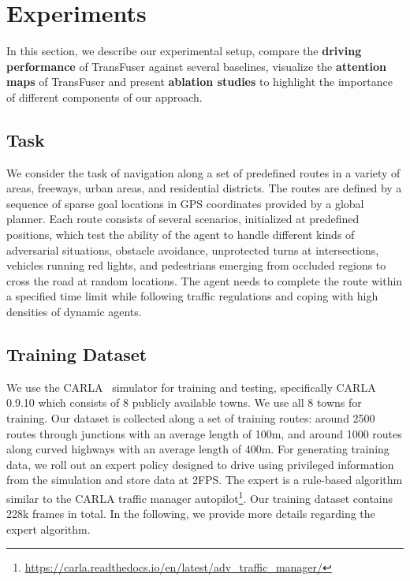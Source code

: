 \section{Experiments}
\label{sec:results}

In this section, we describe our experimental setup, compare the \textbf{driving performance} of TransFuser against several baselines, visualize the \textbf{attention maps} of TransFuser and present \textbf{ablation studies} to highlight the importance of different components of our approach.

\subsection{Task}
\label{sec:task}
We consider the task of navigation along a set of predefined routes in a variety of areas, \eg freeways, urban areas, and residential districts. The routes are defined by a sequence of sparse goal locations in GPS coordinates provided by a global planner. Each route consists of several scenarios, initialized at predefined positions, which test the ability of the agent to handle different kinds of adversarial situations, \eg obstacle avoidance, unprotected turns at intersections, vehicles running red lights, and pedestrians emerging from occluded regions to cross the road at random locations. The agent needs to complete the route within a specified time limit while following traffic regulations and coping with high densities of dynamic agents.

\subsection{Training Dataset}
\label{sec:data}
We use the CARLA~\cite{Dosovitskiy2017CORL} simulator for training and testing, specifically CARLA 0.9.10 which consists of 8 publicly available towns. We use all 8 towns for training. Our dataset is collected along a set of training routes: around 2500 routes through junctions with an average length of 100m, and around 1000 routes along curved highways with an average length of 400m. For generating training data, we roll out an expert policy designed to drive using privileged information from the simulation and store data at 2FPS. The expert is a rule-based algorithm similar to the CARLA traffic manager autopilot\footnote{\url{https://carla.readthedocs.io/en/latest/adv_traffic_manager/}}. Our training dataset contains 228k frames in total. In the following, we provide more details regarding the expert algorithm.


